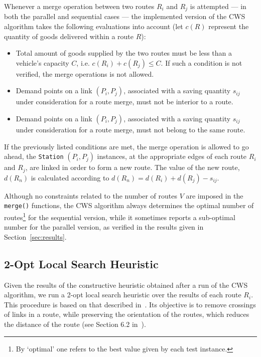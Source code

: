 Whenever a merge operation between two routes $R_i$ and $R_j$ is attempted --- in 
both the parallel and sequential cases --- the implemented version of the CWS 
algorithm takes the following evaluations into account (let $c(R)$ represent 
the quantity of goods delivered within a route $R$):

\begin{itemize}

    \item Total amount of goods supplied by the two routes must be less than 
            a vehicle's capacity $C$, i.e. $c(R_i) + c(R_j) \le C$. If 
            such a condition is not verified, the merge operations is not allowed.
    \item Demand points on a link $(P_i,P_j)$, associated with a saving quantity $s_{ij}$ 
            under consideration for a route merge, must not be interior to 
            a route.
    \item Demand points on a link $(P_i,P_j)$, associated with a saving quantity $s_{ij}$ 
            under consideration for a route merge, must not belong to the same 
            route.

\end{itemize}

If the previously listed conditions are met, the merge operation is allowed to 
go ahead, the \verb?Station? $(P_i,P_j)$ instances, at the appropriate edges of each 
route $R_i$ and $R_j$, are linked in order to form a new route. The value of the 
new route, $d(R_n)$ is calculated according to 
$d(R_n) = d(R_i) + d(R_j) - s_{ij}$.\vertbreak

Although no constraints related to the number 
of routes $V$ are imposed in the \verb?merge()? functions, the CWS algorithm always 
determines the optimal number of routes\footnote{By `optimal' one refers to the 
best value given by each test instance.} for the sequential version, while it 
sometimes reports a sub-optimal number for the parallel 
version, as verified in the results given in Section~\ref{sec:results}.

\subsection{2-Opt Local Search Heuristic}
\label{subsec:2-opt}

Given the results of the constructive heuristic obtained after a run of the CWS 
algorithm, we run a 2-opt local search heuristic over the results of each route 
$R_i$. This procedure is based on that described in~\cite{Psaraftis1983391, 
Thangiahl1996}. Its objective is to remove crossings of links in a route, while 
preserving the orientation of the routes, which reduces the distance of the 
route (see Section 6.2 in~\cite{Michalewicz2004}).\vertbreak

